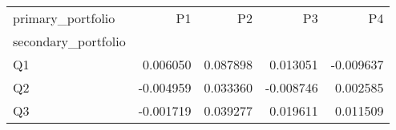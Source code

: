 \begin{tabular}{lrrrr}
\toprule
primary_portfolio & P1 & P2 & P3 & P4 \\
secondary_portfolio &  &  &  &  \\
\midrule
Q1 & 0.006050 & 0.087898 & 0.013051 & -0.009637 \\
Q2 & -0.004959 & 0.033360 & -0.008746 & 0.002585 \\
Q3 & -0.001719 & 0.039277 & 0.019611 & 0.011509 \\
\bottomrule
\end{tabular}
